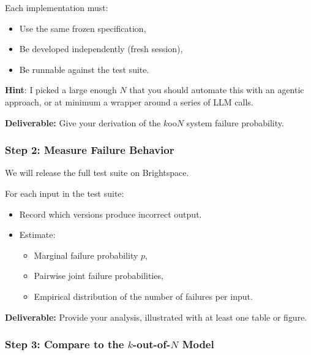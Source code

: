 Each implementation must:

\begin{itemize}
  \item Use the same frozen specification,
  \item Be developed independently (fresh session),
  \item Be runnable against the test suite.
\end{itemize}

\textbf{Hint}: I picked a large enough $N$ that you should automate this with an agentic approach, or at minimum a wrapper around a series of LLM calls.

 \begin{tcolorbox}[colback=yellow!10,colframe=black,boxrule=0.5pt]
  \textbf{Deliverable:} Give your derivation of the $k$oo$N$ system failure probability.
  \end{tcolorbox} 

\subsubsection{Step 2: Measure Failure Behavior}

We will release the full test suite on Brightspace.

For each input in the test suite:

\begin{itemize}
  \item Record which versions produce incorrect output.
  \item Estimate:
  \begin{itemize}
    \item Marginal failure probability $p$,
    \item Pairwise joint failure probabilities,
    \item Empirical distribution of the number of failures per input.
  \end{itemize}
\end{itemize}

 \begin{tcolorbox}[colback=yellow!10,colframe=black,boxrule=0.5pt]
  \textbf{Deliverable:} Provide your analysis, illustrated with at least one table or figure.
  \end{tcolorbox} 

\subsubsection{Step 3: Compare to the $k$-out-of-$N$ Model}

